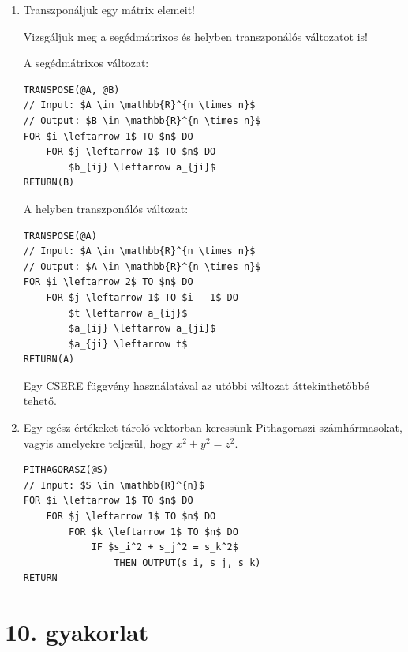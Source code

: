\documentclass[a4paper]{article}
\newenvironment{solution}
{\color{RoyalBlue}}{\bigskip}
\begin{document}
\begin{enumerate}
\item

Transzponáljuk egy mátrix elemeit!

\medskip

Vizsgáljuk meg a segédmátrixos és helyben transzponálós változatot is!

\begin{solution}

A segédmátrixos változat:
\begin{lstlisting}[mathescape]
TRANSPOSE(@A, @B)
// Input: $A \in \mathbb{R}^{n \times n}$
// Output: $B \in \mathbb{R}^{n \times n}$
FOR $i \leftarrow 1$ TO $n$ DO
    FOR $j \leftarrow 1$ TO $n$ DO
        $b_{ij} \leftarrow a_{ji}$
RETURN(B)
\end{lstlisting}

A helyben transzponálós változat:
\begin{lstlisting}[mathescape]
TRANSPOSE(@A)
// Input: $A \in \mathbb{R}^{n \times n}$
// Output: $A \in \mathbb{R}^{n \times n}$
FOR $i \leftarrow 2$ TO $n$ DO
    FOR $j \leftarrow 1$ TO $i - 1$ DO
        $t \leftarrow a_{ij}$
        $a_{ij} \leftarrow a_{ji}$
        $a_{ji} \leftarrow t$
RETURN(A)
\end{lstlisting}

Egy CSERE függvény használatával az utóbbi változat áttekinthetőbbé tehető.

\end{solution}

\item

Egy egész értékeket tároló vektorban keressünk Pithagoraszi számhármasokat, vagyis amelyekre teljesül, hogy $x^2 + y^2 = z^2$.


\begin{solution}
\begin{lstlisting}[mathescape]
PITHAGORASZ(@S)
// Input: $S \in \mathbb{R}^{n}$
FOR $i \leftarrow 1$ TO $n$ DO
    FOR $j \leftarrow 1$ TO $n$ DO
        FOR $k \leftarrow 1$ TO $n$ DO
            IF $s_i^2 + s_j^2 = s_k^2$
                THEN OUTPUT(s_i, s_j, s_k)
RETURN
\end{lstlisting}

\end{solution}

\end{enumerate}

\section*{10. gyakorlat}
\end{document}
